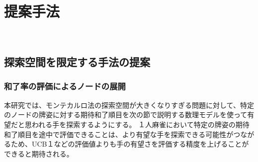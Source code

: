 \chapter{提案手法}　%
\label{chap:approach}

\section{探索空間を限定する手法の提案}
\subsection{和了率の評価によるノードの展開}

本研究では、モンテカルロ法の探索空間が大きくなりすぎる問題に対して、特定のノードの牌姿に対する期待和了順目を次の節で説明する数理モデルを使って有望だと思われる手を探索するようにする。
１人麻雀において特定の牌姿の期待和了順目を途中で評価できることは、より有望な手を探索できる可能性がつながるため、UCB１などの評価値よりも手の有望さを評価する精度を上げることができると期待される。



